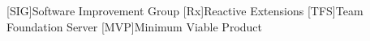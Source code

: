 [SIG]{Software Improvement Group}
[Rx]{Reactive Extensions}
[TFS]{Team Foundation Server}
[MVP]{Minimum Viable Product}
